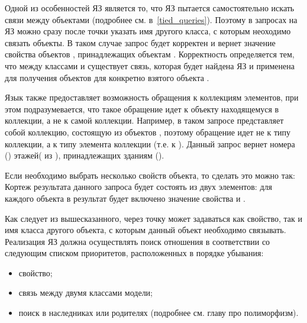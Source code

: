Одной из особенностей ЯЗ является то, что ЯЗ пытается самостоятельно искать связи между 
объектами (подробнее см. в~\ref{tied_queries}). Поэтому в запросах на ЯЗ можно
сразу после точки указать имя другого класса, с которым неоходимо связать объекты.
В таком случае запрос
будет корректен и вернет значение свойства  объектов ,
принадлежащих объектам . Корректность определяется тем, что между классами
 и  существует связь, которая будет найдена
ЯЗ и применена для получения объектов  для конкретно взятого
объекта .

Язык также предоставляет возможность обращения к коллекциям
элементов, при этом подразумевается, что такое обращение идет к объекту находящемуся в
коллекции, а не к самой коллекции.
Например, в таком запросе
 представляет собой коллекцию, состоящую из объектов , поэтому
обращение  идет не к типу коллекции, а к типу элемента коллекции (т.е. к ).
Данный запрос вернет номера () этажей( из ), принадлежащих зданиям 
().

Если необходимо выбрать несколько свойств объекта, то сделать это можно так:
Кортеж результата данного запроса будет состоять из двух элементов: для каждого объекта 
в результат будет включено значение свойства  и .

Как следует из вышесказанного, через точку может задаваться как свойство, так и
имя класса другого объекта, с которым данный объект необходимо связывать. Реализация ЯЗ
должна осуществлять поиск отношения в соответствии со следующим списком приоритетов, расположенных в
порядке убывания: 
\begin{itemize}\addtolength{\itemsep}{-0.7\baselineskip}
    \item свойство;
    \item связь между двумя классами модели;
    \item поиск в наследниках или родителях (подробнее см. главу про полиморфизм).
\end{itemize}





